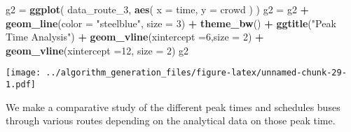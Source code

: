 \documentclass[
]{article}
\newenvironment{Shaded}{\begin{snugshade}}{\end{snugshade}}
\newcommand{\DataTypeTok}[1]{\textcolor[rgb]{0.13,0.29,0.53}{#1}}
\newcommand{\DecValTok}[1]{\textcolor[rgb]{0.00,0.00,0.81}{#1}}
\newcommand{\KeywordTok}[1]{\textcolor[rgb]{0.13,0.29,0.53}{\textbf{#1}}}
\newcommand{\NormalTok}[1]{#1}
\newcommand{\OperatorTok}[1]{\textcolor[rgb]{0.81,0.36,0.00}{\textbf{#1}}}
\newcommand{\StringTok}[1]{\textcolor[rgb]{0.31,0.60,0.02}{#1}}
\begin{document}
\begin{Shaded}
\begin{Highlighting}[]
\NormalTok{g2 =}\StringTok{ }\KeywordTok{ggplot}\NormalTok{(}
\NormalTok{  data_route_}\DecValTok{3}\NormalTok{,}
      \KeywordTok{aes}\NormalTok{(}
        \DataTypeTok{x =}\NormalTok{ time,}
        \DataTypeTok{y =}\NormalTok{ crowd}
\NormalTok{      )}
\NormalTok{) }
\NormalTok{g2 =}\StringTok{ }\NormalTok{g2 }\OperatorTok{+}\StringTok{ }\KeywordTok{geom_line}\NormalTok{(}\DataTypeTok{color =} \StringTok{"steelblue"}\NormalTok{, }\DataTypeTok{size =} \DecValTok{3}\NormalTok{) }\OperatorTok{+}\StringTok{ }\KeywordTok{theme_bw}\NormalTok{() }\OperatorTok{+}\StringTok{ }\KeywordTok{ggtitle}\NormalTok{(}\StringTok{"Peak Time Analysis"}\NormalTok{) }\OperatorTok{+}\StringTok{ }\KeywordTok{geom_vline}\NormalTok{(}\DataTypeTok{xintercept =}\DecValTok{6}\NormalTok{,}\DataTypeTok{size =} \DecValTok{2}\NormalTok{) }\OperatorTok{+}\StringTok{ }\KeywordTok{geom_vline}\NormalTok{(}\DataTypeTok{xintercept =}\DecValTok{12}\NormalTok{, }\DataTypeTok{size =} \DecValTok{2}\NormalTok{) }
\NormalTok{g2}
\end{Highlighting}
\end{Shaded}

\texttt{[image: ../algorithm\_generation\_files/figure-latex/unnamed-chunk-29-1.pdf]}

We make a comparative study of the different peak times and schedules
buses through various routes depending on the analytical data on those
peak time.
\end{document}
